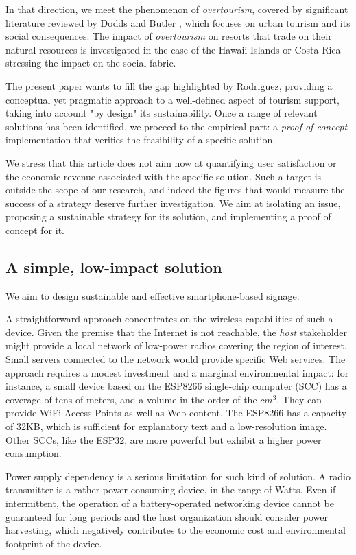 \documentclass[sustainability,article,submit,pdftex,moreauthors]{Definitions/mdpi}
\begin{document}
In that direction, we meet the phenomenon of {\em overtourism}, covered by significant literature reviewed by Dodds and Butler \cite{dod19a}, which focuses on urban tourism and its social consequences. The impact of {\em overtourism} on resorts that trade on their natural resources is investigated in the case of the Hawaii Islands \cite{lin22a} or Costa Rica \cite{mat10a} stressing the impact on the social fabric.

The present paper wants to fill the gap highlighted by Rodriguez, providing a conceptual yet pragmatic approach to a well-defined aspect of tourism support, taking into account "by design" its sustainability. Once a range of relevant solutions has been identified, we proceed to the empirical part: a {\em proof of concept} implementation that verifies the feasibility of a specific solution.

We stress that this article does not aim now at quantifying user satisfaction or the economic revenue associated with the specific solution. Such a target is outside the scope of our research, and indeed the figures that would measure the success of a strategy deserve further investigation. We aim at isolating an issue, proposing a sustainable strategy for its solution, and implementing a proof of concept for it.

\subsection{A simple, low-impact solution}

We aim to design sustainable and effective smartphone-based signage.

A straightforward approach concentrates on the wireless capabilities of such a device. Given the premise that the Internet is not reachable, the {\em host} stakeholder might provide a local network of low-power radios covering the region of interest. Small servers connected to the network would provide specific Web services. The approach requires a modest investment and a marginal environmental impact: for instance, a small device based on the ESP8266 single-chip computer (SCC) has a coverage of tens of meters, and a volume in the order of the $cm^3$. They can provide WiFi Access Points as well as Web content. The ESP8266 has a capacity of 32KB, which is sufficient for explanatory text and a low-resolution image. Other SCCs, like the ESP32, are more powerful but exhibit a higher power consumption. 

Power supply dependency is a serious limitation for such kind of solution. A radio transmitter is a rather power-consuming device, in the range of Watts. Even if intermittent, the operation of a battery-operated networking device cannot be guaranteed for long periods and the host organization should consider power harvesting, which negatively contributes to the economic cost and environmental footprint of the device.
\end{document}
